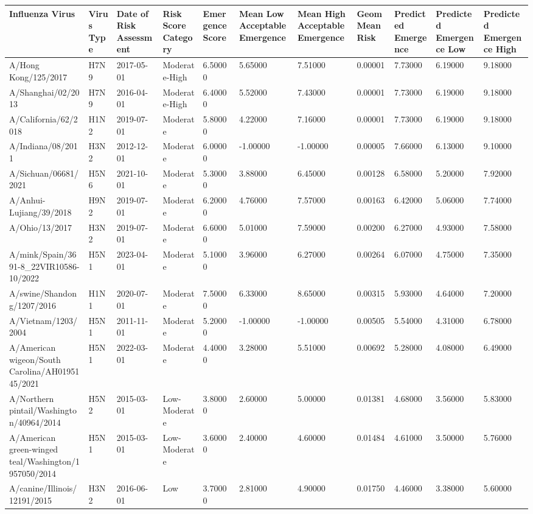 \begin{tabular}{L{1in}|L{1in}|L{1in}|L{1in}|L{1in}|L{1in}|L{1in}|L{1in}|L{1in}|L{1in}|L{1in}}\hline
 Influenza  Virus & Virus  Type & Date  of  Risk  Assessment & Risk  Score  Category & Emergence  Score & Mean  Low  Acceptable  Emergence & Mean  High  Acceptable  Emergence & Geom  Mean  Risk & Predicted  Emergence & Predicted  Emergence  Low & Predicted  Emergence  High \\\hline
 A/Hong  Kong/125/2017 &H7N9&2017-05-01& Moderate-High &6.50000&5.65000&7.51000&0.00001&7.73000&6.19000&9.18000\\\hline
 A/Shanghai/02/2013 &H7N9&2016-04-01& Moderate-High &6.40000&5.52000&7.43000&0.00001&7.73000&6.19000&9.18000\\\hline
 A/California/62/2018 &H1N2&2019-07-01& Moderate &5.80000&4.22000&7.16000&0.00001&7.73000&6.19000&9.18000\\\hline
 A/Indiana/08/2011 &H3N2&2012-12-01& Moderate &6.00000&-1.00000&-1.00000&0.00005&7.66000&6.13000&9.10000\\\hline
 A/Sichuan/06681/2021 &H5N6&2021-10-01& Moderate &5.30000&3.88000&6.45000&0.00128&6.58000&5.20000&7.92000\\\hline
 A/Anhui-Lujiang/39/2018 &H9N2&2019-07-01& Moderate &6.20000&4.76000&7.57000&0.00163&6.42000&5.06000&7.74000\\\hline
 A/Ohio/13/2017 &H3N2&2019-07-01& Moderate &6.60000&5.01000&7.59000&0.00200&6.27000&4.93000&7.58000\\\hline
 A/mink/Spain/3691-8\_22VIR10586-10/2022 &H5N1&2023-04-01& Moderate &5.10000&3.96000&6.27000&0.00264&6.07000&4.75000&7.35000\\\hline
 A/swine/Shandong/1207/2016 &H1N1&2020-07-01& Moderate &7.50000&6.33000&8.65000&0.00315&5.93000&4.64000&7.20000\\\hline
 A/Vietnam/1203/2004 &H5N1&2011-11-01& Moderate &5.20000&-1.00000&-1.00000&0.00505&5.54000&4.31000&6.78000\\\hline
 A/American  wigeon/South  Carolina/AH0195145/2021 &H5N1&2022-03-01& Moderate &4.40000&3.28000&5.51000&0.00692&5.28000&4.08000&6.49000\\\hline
 A/Northern  pintail/Washington/40964/2014 &H5N2&2015-03-01& Low-Moderate &3.80000&2.60000&5.00000&0.01381&4.68000&3.56000&5.83000\\\hline
 A/American  green-winged  teal/Washington/1957050/2014 &H5N1&2015-03-01& Low-Moderate &3.60000&2.40000&4.60000&0.01484&4.61000&3.50000&5.76000\\\hline
 A/canine/Illinois/12191/2015 &H3N2&2016-06-01&Low&3.70000&2.81000&4.90000&0.01750&4.46000&3.38000&5.60000\\\hline

\end{tabular}
